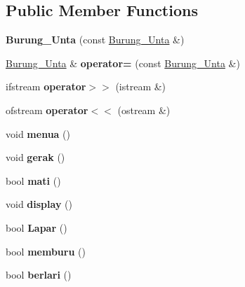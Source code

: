 \subsection*{Public Member Functions}
\begin{DoxyCompactItemize}
\item 
{\bfseries Burung\+\_\+\+Unta} (const \hyperlink{class_burung___unta}{Burung\+\_\+\+Unta} \&)\hypertarget{class_burung___unta_ab23cfda1f70b48598364c8e8baaf3732}{}\label{class_burung___unta_ab23cfda1f70b48598364c8e8baaf3732}

\item 
\hyperlink{class_burung___unta}{Burung\+\_\+\+Unta} \& {\bfseries operator=} (const \hyperlink{class_burung___unta}{Burung\+\_\+\+Unta} \&)\hypertarget{class_burung___unta_a93363d3fba519935e0dfbc537b8d8933}{}\label{class_burung___unta_a93363d3fba519935e0dfbc537b8d8933}

\item 
ifstream {\bfseries operator$>$$>$} (istream \&)\hypertarget{class_burung___unta_ae9e32d70bb8768d7d63d2b66ee4ac529}{}\label{class_burung___unta_ae9e32d70bb8768d7d63d2b66ee4ac529}

\item 
ofstream {\bfseries operator$<$$<$} (ostream \&)\hypertarget{class_burung___unta_a86ceb27cf37e0b67127ff5b0d1814a57}{}\label{class_burung___unta_a86ceb27cf37e0b67127ff5b0d1814a57}

\item 
void {\bfseries menua} ()\hypertarget{class_burung___unta_ab2937aeb5430136ba3a1407b9da21d9b}{}\label{class_burung___unta_ab2937aeb5430136ba3a1407b9da21d9b}

\item 
void {\bfseries gerak} ()\hypertarget{class_burung___unta_ae8a1e6bfdf85cf17fe75975a0454667b}{}\label{class_burung___unta_ae8a1e6bfdf85cf17fe75975a0454667b}

\item 
bool {\bfseries mati} ()\hypertarget{class_burung___unta_a2b67b21633ecc8eb281a365c187c4e0c}{}\label{class_burung___unta_a2b67b21633ecc8eb281a365c187c4e0c}

\item 
void {\bfseries display} ()\hypertarget{class_burung___unta_aba92aed2ccbd8090dddf8a8e8639ab4f}{}\label{class_burung___unta_aba92aed2ccbd8090dddf8a8e8639ab4f}

\item 
bool {\bfseries Lapar} ()\hypertarget{class_burung___unta_a054f1bc836a9c92f7dd84a6fc1e8de99}{}\label{class_burung___unta_a054f1bc836a9c92f7dd84a6fc1e8de99}

\item 
bool {\bfseries memburu} ()\hypertarget{class_burung___unta_a47d84abe318df6ee48d406acbb418f4c}{}\label{class_burung___unta_a47d84abe318df6ee48d406acbb418f4c}

\item 
bool {\bfseries berlari} ()\hypertarget{class_burung___unta_a56809a57636513f69c5c8cf2e05bb5f8}{}\label{class_burung___unta_a56809a57636513f69c5c8cf2e05bb5f8}

\end{DoxyCompactItemize}


